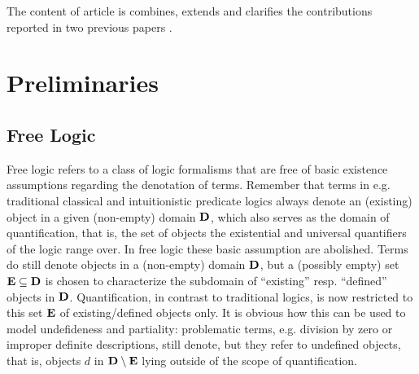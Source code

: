 The content of article is combines, extends and clarifies the
contributions reported in two previous papers \cite{ICMS,ArXiv}.




\section{Preliminaries}
\label{sec:preliminaries}
\subsection{Free Logic}
Free logic \cite{Lambert60,Scottt} refers to a class of logic
formalisms that are free of basic existence assumptions regarding the
denotation of terms. Remember that terms in e.g. traditional classical
and intuitionistic predicate logics always denote an (existing) object
in a given (non-empty) domain $\mathbf{D}$, which also serves as the domain of
quantification, that is, the set of objects the existential and
universal quantifiers of the logic range over. In free logic these
basic assumption are abolished. Terms do still denote objects in a
(non-empty) domain $\mathbf{D}$, but a (possibly empty) set $\mathbf{E}\subseteq \mathbf{D}$ is
chosen to characterize the subdomain of ``existing'' resp. ``defined''
objects in $\mathbf{D}$. Quantification, in contrast to traditional logics, is
now restricted to this set $\mathbf{E}$ of existing/defined objects only. It is
obvious how this can be used to model undefideness and partiality:
problematic terms, e.g. division by zero or improper definite
descriptions, still denote, but they refer to undefined objects, that
is, objects $d$ in $\mathbf{D}\setminus \mathbf{E}$ lying outside of the scope of
quantification.  

